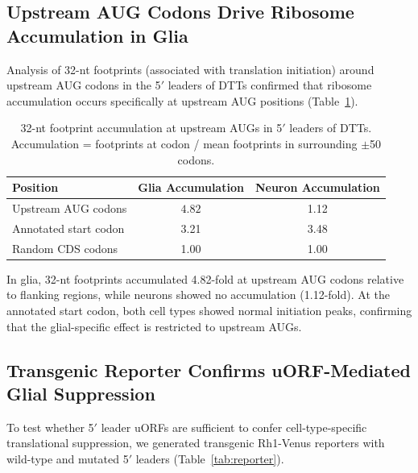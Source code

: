 \documentclass[11pt]{article}
\begin{document}
\subsection{Upstream AUG Codons Drive Ribosome Accumulation in Glia}

Analysis of 32-nt footprints (associated with translation initiation) around upstream AUG codons in the 5$'$ leaders of DTTs confirmed that ribosome accumulation occurs specifically at upstream AUG positions (Table~\ref{tab:uaug}).

\begin{table}[H]
\centering
\caption{32-nt footprint accumulation at upstream AUGs in 5$'$ leaders of DTTs. Accumulation = footprints at codon / mean footprints in surrounding $\pm$50 codons.}
\label{tab:uaug}
\begin{tabular}{lcc}
\toprule
Position & Glia Accumulation & Neuron Accumulation \\
\midrule
Upstream AUG codons & $\mathbf{4.82}$ & 1.12 \\
Annotated start codon & 3.21 & 3.48 \\
Random CDS codons & 1.00 & 1.00 \\
\bottomrule
\end{tabular}
\end{table}

In glia, 32-nt footprints accumulated 4.82-fold at upstream AUG codons relative to flanking regions, while neurons showed no accumulation (1.12-fold). At the annotated start codon, both cell types showed normal initiation peaks, confirming that the glial-specific effect is restricted to upstream AUGs.

\subsection{Transgenic Reporter Confirms uORF-Mediated Glial Suppression}

To test whether 5$'$ leader uORFs are sufficient to confer cell-type-specific translational suppression, we generated transgenic Rh1-Venus reporters with wild-type and mutated 5$'$ leaders (Table~\ref{tab:reporter}).
\end{document}
